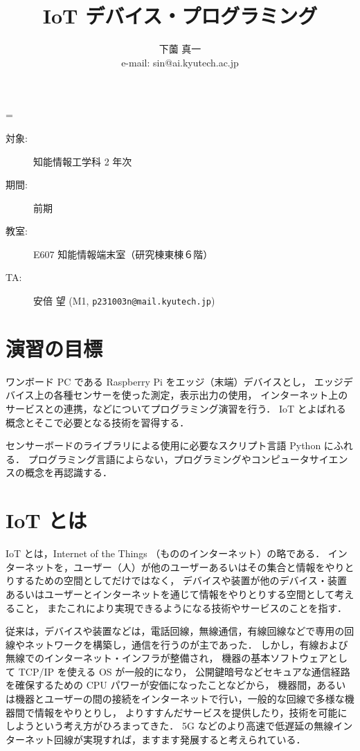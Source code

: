 \documentclass[11pt,a4,epsf]{article}
\title{{\bf IoT デバイス・プログラミング}}
\author{下薗 真一\\
e-mail: {\sf sin@ai.kyutech.ac.jp}\\
}
\def\linesparpage#1{\baselineskip=\textheight\divide\baselineskip#1}
\begin{document}
\linesparpage{36}
\maketitle

\medskip

\begin{description}
\item[対象:] 知能情報工学科 2 年次
\item[期間:] 前期
\item[教室:] E607 知能情報端末室（研究棟東棟６階）
\item[TA:] 安倍 望 (M1, \verb+p231003n@mail.kyutech.jp+)
\end{description}

\medskip

\section{演習の目標}

ワンボード PC である Raspberry Pi をエッジ（末端）デバイスとし，
エッジデバイス上の各種センサーを使った測定，表示出力の使用，
インターネット上のサービスとの連携，などについてプログラミング演習を行う．
IoT とよばれる概念とそこで必要となる技術を習得する．

センサーボードのライブラリによる使用に必要なスクリプト言語 Python にふれる．
プログラミング言語によらない，プログラミングやコンピュータサイエンスの概念を再認識する．

\section{IoT とは}

IoT とは，Internet of the Things （もののインターネット）の略である．
インターネットを，ユーザー（人）が他のユーザーあるいはその集合と情報をやりとりするための空間としてだけではなく，
デバイスや装置が他のデバイス・装置あるいはユーザーとインターネットを通じて情報をやりとりする空間として考えること，
またこれにより実現できるようになる技術やサービスのことを指す．

従来は，デバイスや装置などは，電話回線，無線通信，有線回線などで専用の回線やネットワークを構築し，通信を行うのが主であった．
しかし，有線および無線でのインターネット・インフラが整備され，
機器の基本ソフトウェアとして TCP/IP を使える OS が一般的になり，
公開鍵暗号などセキュアな通信経路を確保するための CPU パワーが安価になったことなどから，
機器間，あるいは機器とユーザーの間の接続をインターネットで行い，一般的な回線で多様な機器間で情報をやりとりし，
よりすすんだサービスを提供したり，技術を可能にしようという考え方がひろまってきた．
5G などのより高速で低遅延の無線インターネット回線が実現すれば，ますます発展すると考えられている．
\end{document}
